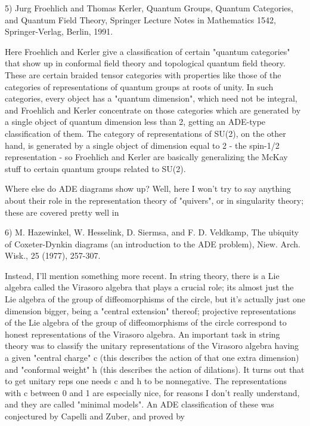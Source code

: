 5) Jurg Froehlich and Thomas Kerler, Quantum Groups, Quantum Categories,
and Quantum Field Theory, Springer Lecture Notes in Mathematics 1542,
Springer-Verlag, Berlin, 1991.

Here Froehlich and Kerler give a classification of certain "quantum
categories" that show up in conformal field theory and topological
quantum field theory.  These are certain braided tensor categories
with properties like those of the categories of representations of quantum
groups at roots of unity.  In such categories, every object has a
"quantum dimension", which need not be integral, and Froehlich and
Kerler concentrate on those categories which are generated by a single
object of quantum dimension less than 2, getting an ADE-type classification of
them.  The category of representations of SU(2), on the other hand, is
generated by a single object of dimension equal to 2 - the spin-1/2
representation - so Froehlich and Kerler are basically generalizing the
McKay stuff to certain quantum groups related to SU(2).  

Where else do ADE diagrams show up?  Well, here I won't try to say
anything about their role in the representation theory of "quivers", or 
in singularity theory; these are covered pretty well in

6) M. Hazewinkel, W. Hesselink, D. Siermsa, and F. D. Veldkamp, 
The ubiquity of Coxeter-Dynkin diagrams (an introduction to the ADE
problem), Niew. Arch. Wisk., 25 (1977), 257-307.

Instead, I'll mention something more recent.  In string theory, there is
a Lie algebra called the Virasoro algebra that plays a crucial role;
its almost just the Lie algebra of the group of diffeomorphisms of the
circle, but it's actually just one dimension bigger, being a "central
extension" thereof; projective representations of the Lie algebra of
the group of diffeomorphisms of the circle correspond to honest
representations of the Virasoro algebra.  An important task in string
theory was to classify the unitary representations of the Virasoro
algebra having a given "central charge" c (this describes the action of
that one extra dimension) and "conformal weight" h (this describes
the action of dilations).  It turns out that to get unitary reps one
needs c and h to be nonnegative.  The representations with c between 0
and 1 are especially nice, for reasons I don't really understand, and
they are called "minimal models".  An ADE classification of these was
conjectured by Capelli and Zuber, and proved by

